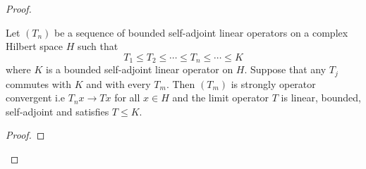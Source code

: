 \begin{proof}
\begin{theorem}\label{9.3-3}
   Let \( ({T}_{n}) \) be a sequence of bounded self-adjoint linear operators on a complex Hilbert space \( H \) such that  \[  {T}_{1} \leq {T}_{2} \leq \cdots \leq {T}_{n} \leq \cdots \leq K  \]
   where \( K   \) is a bounded self-adjoint linear operator on \( H  \). Suppose that any \( {T}_{j} \) commutes with \( K  \) and with every \( {T}_{m} \). Then \( ({T}_{m}) \) is strongly operator convergent i.e \( {T}_{n}x \to Tx \) for all \( x \in H \) and the limit operator \( T  \) is linear, bounded, self-adjoint and satisfies \( T \leq K  \).
\end{theorem}
\begin{proof}

\end{proof}


\end{proof}
